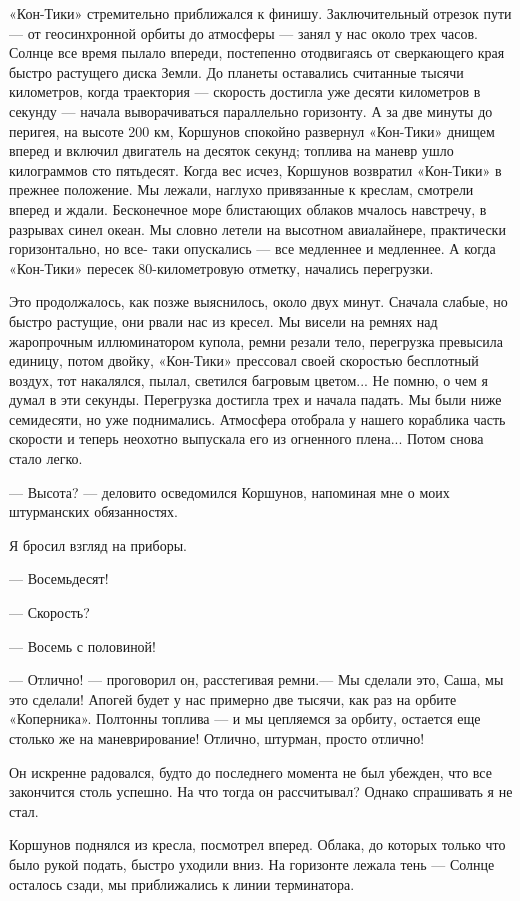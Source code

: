 \documentclass[11pt,a4paper,oneside]{article}
\begin{document}
«Кон-Тики» стремительно приближался к финишу. Заключительный отрезок пути — от геосинхронной орбиты до атмосферы — занял у нас около трех часов. Солнце все время пылало впереди, постепенно отодвигаясь от сверкающего края быстро растущего диска Земли. До планеты оставались считанные тысячи километров, когда траектория — скорость достигла уже десяти километров в секунду — начала выворачиваться параллельно горизонту. А за две минуты до перигея, на высоте 200 км, Коршунов спокойно развернул «Кон-Тики» днищем вперед и включил двигатель на десяток секунд; топлива на маневр ушло килограммов сто пятьдесят. Когда вес исчез, Коршунов возвратил «Кон-Тики» в прежнее положение. Мы лежали, наглухо привязанные к креслам, смотрели вперед и ждали. Бесконечное море блистающих облаков мчалось навстречу, в разрывах синел океан. Мы словно летели на высотном авиалайнере, практически горизонтально, но все- таки опускались — все медленнее и медленнее. А когда «Кон-Тики» пересек 80-километровую отметку, начались перегрузки.

Это продолжалось, как позже выяснилось, около двух минут. Сначала слабые, но быстро растущие, они рвали нас из кресел. Мы висели на ремнях над жаропрочным иллюминатором купола, ремни резали тело, перегрузка превысила единицу, потом двойку, «Кон-Тики» прессовал своей скоростью бесплотный воздух, тот накалялся, пылал, светился багровым цветом... Не помню, о чем я думал в эти секунды. Перегрузка достигла трех и начала падать. Мы были ниже семидесяти, но уже поднимались. Атмосфера отобрала у нашего кораблика часть скорости и теперь неохотно выпускала его из огненного плена... Потом снова стало легко.

— Высота? — деловито осведомился Коршунов, напоминая мне о моих штурманских обязанностях.

Я бросил взгляд на приборы.

— Восемьдесят!

— Скорость?

— Восемь с половиной!

— Отлично! — проговорил он, расстегивая ремни.— Мы сделали это, Саша, мы это сделали! Апогей будет у нас примерно две тысячи, как раз на орбите «Коперника». Полтонны топлива — и мы цепляемся за орбиту, остается еще столько же на маневрирование! Отлично, штурман, просто отлично!

Он искренне радовался, будто до последнего момента не был убежден, что все закончится столь успешно. На что тогда он рассчитывал? Однако спрашивать я не стал.

Коршунов поднялся из кресла, посмотрел вперед. Облака, до которых только что было рукой подать, быстро уходили вниз. На горизонте лежала тень — Солнце осталось сзади, мы приближались к линии терминатора.
\end{document}
